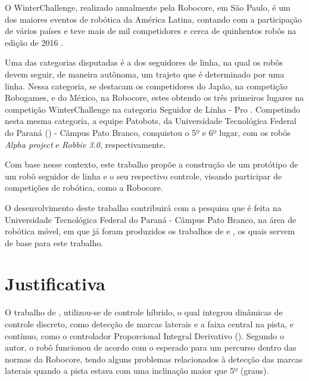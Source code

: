 O WinterChallenge, realizado anualmente pela Robocore, em São Paulo, 
é um dos maiores eventos de robótica da América Latina, contando com a participação de vários países e teve 
mais de mil competidores e cerca de quinhentos robôs na edição de 2016 \cite{maua}.\par

Uma das categorias disputadas é a dos seguidores de linha, na qual os robôs devem seguir, de maneira autônoma, 
um trajeto que é determinado por uma linha. Nessa categoria, se destacam os competidores do Japão, na competição Robogames, 
e do México, na Robocore, estes obtendo os três primeiros lugares na competição WinterChallenge na categoria 
Seguidor de Linha - Pro \cite{winter}. Competindo nesta mesma categoria, 
a equipe Patobots, da Universidade Tecnológica Federal do Paraná 
() - 
Câmpus Pato Branco, conquistou o 5º e 6º lugar, com os robôs \textit{Alpha project} e 
\textit{Robbie 3.0}, respectivamente.\par

Com base nesse contexto, este trabalho propõe a construção de um protótipo de um robô seguidor de linha
e o seu respectivo controle, 
visando participar de competições de robótica, como a Robocore.

O desenvolvimento deste trabalho contribuirá com a pesquisa que é feita na Universidade Tecnológica Federal do Paraná 
- Câmpus Pato Branco, na área de robótica móvel, em que já foram produzidos 
os trabalhos de  e , os quais servem de base para este trabalho.

\begin{spacing}{2}\end{spacing}
\section{Justificativa} \label{Justi}

O trabalho de ,
utilizou-se de controle híbrido, o qual 
integrou dinâmicas de controle discreto, como detecção de marcas laterais e a faixa central na pista, e contínuo, 
como o controlador Proporcional Integral Derivativo (). Segundo o autor, 
o robô funcionou de acordo com o esperado para um percurso dentro das normas da Robocore, 
tendo alguns problemas relacionados à detecção das marcas laterais quando a pista estava com uma inclinação 
maior que 5º (graus).

